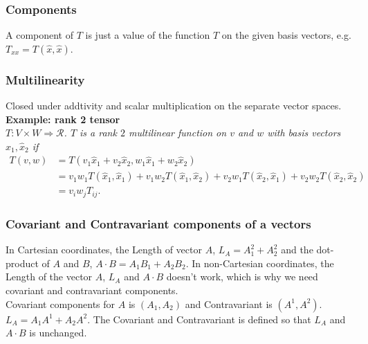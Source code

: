 \subsubsection{Components}
A component of $T$ is just a value of the function $T$ on the given basis vectors, e.g. $T_{xx}= T(\hat{x},\hat{x})$. 

\subsubsection{Multilinearity}
Closed under addtivity and scalar multiplication on the separate vector spaces. \\
{\bf Example: rank 2 tensor} \\ 
\emph{
$T: V \times W \Rightarrow \mathcal{R}$.
$T$ is a rank $2$ multilinear function on $v$ and $w$ with basis vectors $\hat{x}_1, \hat{x}_2$ if
\begin{equation*}
   \begin{aligned}
      T(v,w) & = T(v_1\hat{x}_1+v_2\hat{x}_2,w_1\hat{x}_1+w_2\hat{x}_2) \\
             & = v_1w_1T(\hat{x}_1,\hat{x}_1)+ v_1w_2T(\hat{x}_1,\hat{x}_2)+ v_2w_1T(\hat{x}_2,\hat{x}_1)+ v_2w_2T(\hat{x}_2,\hat{x}_2) \\
             & = v_iw_jT_{ij}. 
   \end{aligned}
\end{equation*}
}




\subsubsection{Covariant and Contravariant components of a vectors}
In Cartesian coordinates, the Length of vector $A$, $L_A= A_1^2+A_2^2$ and the dot-product of $A$ and $B$, $A \cdot B= A_1B_1 + A_2B_2$.
In non-Cartesian coordinates, the Length of the vector $A$, $L_A$ and $A\cdot B$ doesn't work, which is why we need covariant and contravariant components. \\
Covariant components for $A$ is $(A_1,A_2)$ and Contravariant is $(A^1,A^2)$.
$L_A= A_1A^1+A_2A^2$.
The Covariant and Contravariant is defined so that $L_A$ and $A\cdot B$ is unchanged.

